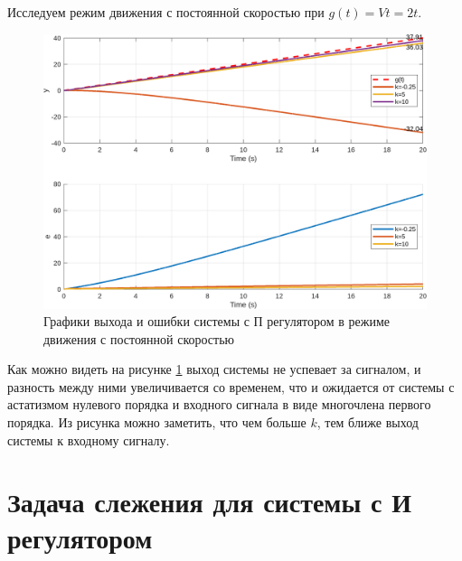 Исследуем режим движения с постоянной скоростью при $g(t) = Vt=2t$. 
\begin{figure}[H]
    \centering
    \includegraphics[width=1\textwidth]{figs/task_3_out_1.png}
    \caption{Графики выхода и ошибки системы с П регулятором в режиме движения с постоянной скоростью}
    \label{fig:task_3_out_1}
\end{figure}
Как можно видеть на рисунке \ref{fig:task_3_out_1} выход системы не успевает за сигналом,
и разность между ними увеличивается со временем, что и ожидается от системы с астатизмом
нулевого порядка и входного сигнала в виде многочлена первого порядка. Из рисунка
можно заметить, что чем больше $k$, тем ближе выход системы к входному сигналу.


\section{Задача слежения для системы с И регулятором}

